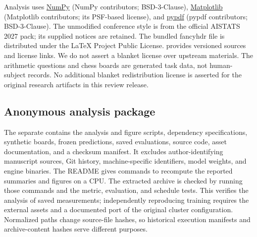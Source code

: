Analysis uses \href{https://numpy.org/}{NumPy} (NumPy contributors; BSD-3-Clause), \href{https://matplotlib.org/}{Matplotlib} (Matplotlib contributors; its PSF-based license), and \href{https://pypdf.readthedocs.io/}{pypdf} (pypdf contributors; BSD-3-Clause). The unmodified conference style is from the official AISTATS 2027 pack; its supplied notices are retained. The bundled fancyhdr file is distributed under the LaTeX Project Public License.  provides versioned sources and license links. We do not assert a blanket license over upstream materials. The arithmetic questions and chess boards are generated task data, not human-subject records. No additional blanket redistribution license is asserted for the original research artifacts in this review release.

\subsection{Anonymous analysis package}\label{app:anonymous-package}
The separate  contains the analysis and figure scripts, dependency specifications, synthetic boards, frozen predictions, saved evaluations, source code, asset documentation, and a checksum manifest. It excludes author-identifying manuscript sources, Git history, machine-specific identifiers, model weights, and engine binaries. The README gives commands to recompute the reported summaries and figures on a CPU. The extracted archive is checked by running those commands and the metric, evaluation, and schedule tests. This verifies the analysis of saved measurements; independently reproducing training requires the external assets and a documented port of the original cluster configuration. Normalized paths change source-file hashes, so historical execution manifests and archive-content hashes serve different purposes.
